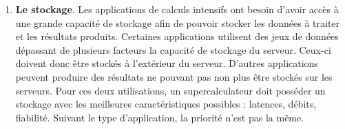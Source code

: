 \begin{enumerate}
             
           
                  
                    
            \item \textbf{Le stockage}. Les applications de calculs intensifs ont besoin d'avoir accès à une grande capacité de stockage afin de pouvoir stocker les données à traiter et les résultats produits. Certaines applications utilisent des jeux de données dépassant de plusieurs facteurs la capacité de stockage du serveur. Ceux-ci doivent donc être stockés à l'extérieur du serveur. D'autres applications peuvent produire des résultats ne pouvant pas non plus être stockés sur les serveurs. Pour ces deux utilisations, un supercalculateur doit posséder un stockage avec les meilleures caractéristiques possibles : latences, débits, fiabilité. Suivant le type d'application, la priorité n'est pas la même.
            
            
                   

\end{enumerate}
